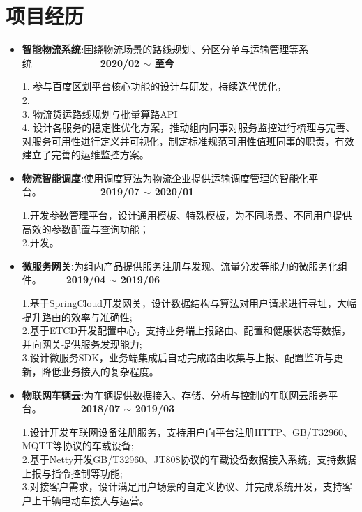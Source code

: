 \documentclass[letterpaper, UTF8, 11pt]{article}
\begin{document}
	\section*{\textbf{项目经历}}\vspace{-0.12in}
	\begin{itemize}	
		\item \textbf{\href{https://lbsyun.baidu.com/solutions/logisticsmap}{智能物流系统}:}{围绕物流场景的路线规划、分区分单与运输管理等系统}~~~~~~~~~~~~~~\textbf{2020/02 $\sim$ 至今}
		
		1. 参与百度区划平台核心功能的设计与研发，持续迭代优化，\\
		2. \\
		3. 物流货运路线规划与批量算路API \\
		4. 设计各服务的稳定性优化方案，推动组内同事对服务监控进行梳理与完善、对服务可用性进行定义并可视化，制定标准规范可用性值班同事的职责，有效建立了完善的运维监控方案。
		
		\vspace{0.03in}

		\item \textbf{\href{https://lbsyun.baidu.com/solutions/scheduling}{物流智能调度}:}{使用调度算法为物流企业提供运输调度管理的智能化平台。}~~~~~~~~~~~~\textbf{2019/07 $\sim$ 2020/01}
		
		1.开发参数管理平台，设计通用模板、特殊模板，为不同场景、不同用户提供高效的参数配置与查询功能；\\
		2.开发。
		
		\vspace{0.03in}

		\item \textbf{微服务网关:}{为组内产品提供服务注册与发现、流量分发等能力的微服务化组件。}~~~~~\textbf{2019/04 $\sim$ 2019/06}
		
		1.基于SpringCloud开发网关，设计数据结构与算法对用户请求进行寻址，大幅提升路由的效率与准确性;\\
		2.基于ETCD开发配置中心，支持业务端上报路由、配置和健康状态等数据，并向网关提供服务发现能力;\\
		3.设计微服务SDK，业务端集成后自动完成路由收集与上报、配置监听与更新，降低业务接入的复杂程度。
		
		\vspace{0.03in}
		
		\item \textbf{\href{https://cloud.baidu.com/product/dugo.html}{物联网车辆云}:}{为车辆提供数据接入、存储、分析与控制的车联网云服务平台。}~~~~~~~~\textbf{2018/07 $\sim$ 2019/03}
		
		1.设计开发车联网设备注册服务，支持用户向平台注册HTTP、GB/T32960、MQTT等协议的车载设备;\\
		2.基于Netty开发GB/T32960、JT808协议的车载设备数据接入系统，支持数据上报与指令控制等功能;\\
		3.对接客户需求，设计满足用户场景的自定义协议、并完成系统开发，支持客户上千辆电动车接入与运营。
		
		\vspace{0.03in}
		
	\end{itemize}
	\vspace{-0.32in}
	
\end{document}
